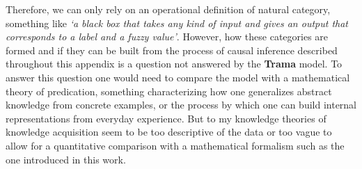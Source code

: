 \documentclass[
		twoside,openright,titlepage,numbers=noenddot,manychapters,
		headinclude,%
                footinclude=false,cleardoublepage=empty,
                BCOR=5mm,
		fontsize=11pt, %
                 enabledeprecatedfontcommands]{scrreprt}
\begin{document}
Therefore, we can only rely on an operational definition of natural category, something like \emph{`a black box that takes any kind of input and gives an output that corresponds to a label and a fuzzy value'}. However, how these categories are formed and if they can be built from the process of causal inference described throughout this appendix is a question not answered by the \textbf{Trama} model. To answer this question one would need to compare the model with a mathematical theory of predication, something characterizing how one generalizes abstract knowledge from concrete examples, or the process by which one can build internal representations from everyday experience. But to my knowledge theories of knowledge acquisition seem to be too descriptive of the data or too vague to allow for a quantitative comparison with a mathematical formalism such as the one introduced in this work.





\end{document}
